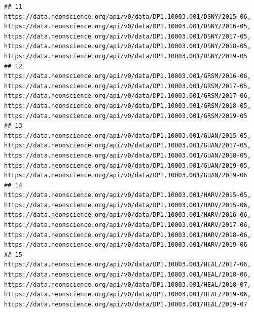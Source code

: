 \documentclass[]{book}
\begin{document}
\begin{verbatim}
## 11                                                                                                                                                                                                                                                                                     https://data.neonscience.org/api/v0/data/DP1.10003.001/DSNY/2015-06, https://data.neonscience.org/api/v0/data/DP1.10003.001/DSNY/2016-05, https://data.neonscience.org/api/v0/data/DP1.10003.001/DSNY/2017-05, https://data.neonscience.org/api/v0/data/DP1.10003.001/DSNY/2018-05, https://data.neonscience.org/api/v0/data/DP1.10003.001/DSNY/2019-05
## 12                                                                                                                                                                                                                                                                                     https://data.neonscience.org/api/v0/data/DP1.10003.001/GRSM/2016-06, https://data.neonscience.org/api/v0/data/DP1.10003.001/GRSM/2017-05, https://data.neonscience.org/api/v0/data/DP1.10003.001/GRSM/2017-06, https://data.neonscience.org/api/v0/data/DP1.10003.001/GRSM/2018-05, https://data.neonscience.org/api/v0/data/DP1.10003.001/GRSM/2019-05
## 13                                                                                                                                                                                                                                                                                     https://data.neonscience.org/api/v0/data/DP1.10003.001/GUAN/2015-05, https://data.neonscience.org/api/v0/data/DP1.10003.001/GUAN/2017-05, https://data.neonscience.org/api/v0/data/DP1.10003.001/GUAN/2018-05, https://data.neonscience.org/api/v0/data/DP1.10003.001/GUAN/2019-05, https://data.neonscience.org/api/v0/data/DP1.10003.001/GUAN/2019-06
## 14                                                                                                                                                                                                                https://data.neonscience.org/api/v0/data/DP1.10003.001/HARV/2015-05, https://data.neonscience.org/api/v0/data/DP1.10003.001/HARV/2015-06, https://data.neonscience.org/api/v0/data/DP1.10003.001/HARV/2016-06, https://data.neonscience.org/api/v0/data/DP1.10003.001/HARV/2017-06, https://data.neonscience.org/api/v0/data/DP1.10003.001/HARV/2018-06, https://data.neonscience.org/api/v0/data/DP1.10003.001/HARV/2019-06
## 15                                                                                                                                                                                                                                                                                     https://data.neonscience.org/api/v0/data/DP1.10003.001/HEAL/2017-06, https://data.neonscience.org/api/v0/data/DP1.10003.001/HEAL/2018-06, https://data.neonscience.org/api/v0/data/DP1.10003.001/HEAL/2018-07, https://data.neonscience.org/api/v0/data/DP1.10003.001/HEAL/2019-06, https://data.neonscience.org/api/v0/data/DP1.10003.001/HEAL/2019-07

\end{verbatim}
\end{document}
